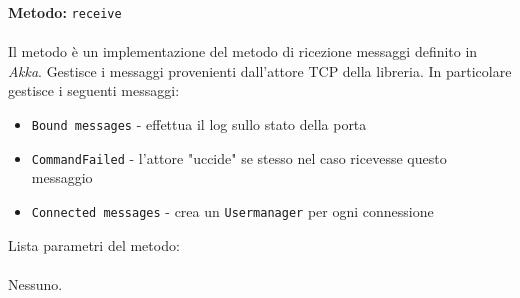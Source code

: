 \documentclass[a4paper]{article}
\begin{document}
		\textbf{Metodo: }\texttt{receive}
			\\ \\
			Il metodo è un implementazione del metodo di ricezione messaggi definito in \emph{Akka}. Gestisce i messaggi provenienti dall'attore TCP della libreria. In particolare gestisce i seguenti messaggi:
			\begin{itemize}
				\item \texttt{Bound messages} - effettua il log sullo stato della porta
				\item \texttt{CommandFailed} - l'attore "uccide" se stesso nel caso ricevesse questo messaggio
				\item \texttt{Connected messages} - crea un \texttt{Usermanager} per ogni connessione
			\end{itemize}
			Lista parametri del metodo:
			\\ \\
			Nessuno.
			
\end{document}
